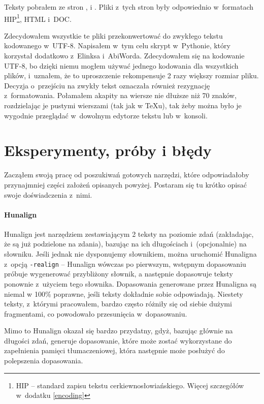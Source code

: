 \documentclass{pracamgr}
\begin{document}
Teksty pobrałem ze stron \cite{orthlib}, \cite{analogion} i
\cite{liturgia}. Pliki z~tych stron były odpowiednio w~formatach
HIP\footnote{HIP -- standard zapisu tekstu
  cerkiewno\-{}słowiańskiego. Więcej szczegółów w~dodatku \ref{encoding}},
HTML i~DOC.

Zdecydowałem wszystkie te pliki przekonwertować do zwykłego tekstu
kodowanego w~UTF-8. Napisałem w~tym celu skrypt w~Pythonie, który
korzystał dodatkowo z~Elinksa i~AbiWorda. Zdecydowałem się na
kodowanie UTF-8, bo dzięki niemu mogłem używać jednego kodowania dla
wszystkich plików, i~uznałem, że to uproszczenie rekompensuje 2 razy
większy rozmiar pliku. Decyzja o~przejściu na zwykły tekst oznaczała
również rezygnację z~formatowania. Połamałem akapity na wiersze nie
dłuższe niż 70 znaków, rozdzielając je pustymi wierszami (tak jak w
TeXu), tak żeby można było je wygodnie przeglądać w~dowolnym edytorze
tekstu lub w~konsoli.


\section{Eksperymenty, próby i błędy}

Zacząłem swoją pracę od poszukiwań gotowych narzędzi, które
odpowiadałoby przynajmniej części założeń opisanych powyżej. Postaram
się tu krótko opisać swoje doświadczenia z~nimi.

\paragraph{Hunalign}\label{r:hunalign}
Hunalign \cite{hunalign} jest narzędziem zestawiającym 2 teksty na poziomie zdań
(zakładając, że są już podzielone na zdania), bazując na ich
długościach i~(opcjonalnie) na słowniku. Jeśli jednak nie dysponujemy
słownikiem, można uruchomić Hunaligna z~opcją {\tt -realign} --
Hunalign wówczas po pierwszym, wstępnym dopasowaniu próbuje wygenerować
przybliżony słownik, a następnie dopasowuje teksty ponownie z~użyciem
tego słownika. Dopasowania generowane przez Hunaligna są niemal w
100\% poprawne, jeśli teksty dokładnie sobie odpowiadają. Niestety
teksty, z~którymi pracowałem, bardzo często różniły się od siebie
dużymi fragmentami, co powodowało przesunięcia w~dopasowaniu.

Mimo to Hunalign okazał się bardzo przydatny, gdyż, bazując głównie na
długości zdań, generuje dopasowanie, które może zostać wykorzystane do
zapełnienia pamięci tłumaczeniowej, która następnie może
posłużyć do polepszenia dopasowania.
\end{document}
